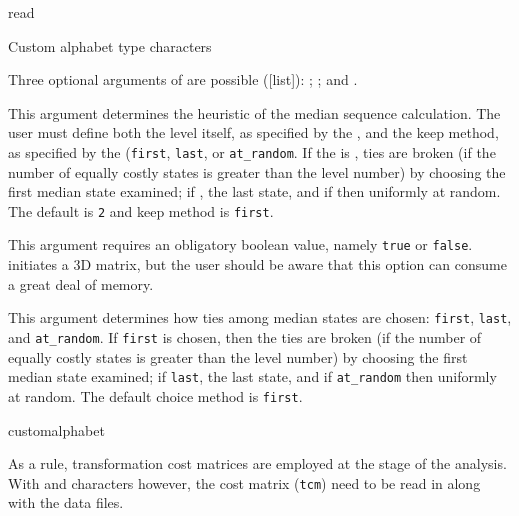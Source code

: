 \begin{command}{read}{}
\begin{arguments}
\begin{argumentgroup}{Custom alphabet type characters}
{	\smallskip
	Three optional arguments of  are possible ([\poylident list]): ; 
	; and .  

	\begin{description}
	{This argument determines the heuristic  of the median sequence calculation.  
	The user must define both the level itself, as specified by the \poyint, and the keep method, as specified 
	by the \poylident (\texttt{first}, \texttt{last}, or \texttt{at\_random}.  If the \poylident is , 
	ties are broken (if the number of equally costly states is greater than the level number) by choosing the 
	first median state examined; if , the last state, and if 
	 then uniformly at random. The default 	 is \texttt{2} and keep method is \texttt{first}.  }
	{}
	
	 {\obligatory \poybool}
	{This argument requires an obligatory boolean value, namely \texttt{true} or \texttt{false}.
	  initiates a 3D matrix, but the user should be aware 
	that this option can consume a great deal of memory.}
	{}
	
	 {\obligatory \poylident}
	{This argument determines how ties among median states are chosen: \texttt{first}, \texttt{last}, 
	and \texttt{at\_random}.  If \texttt{first} is chosen, 	then the ties are broken (if the number of 
	equally costly states is greater than the level number) by choosing the first median state examined; 
	if \texttt{last}, the last state, and if \texttt{at\_random} then uniformly at random. The default choice method is \texttt{first}.}
	{}
	
\end{description}

	}
	 {customalphabet}
	 
\end{argumentgroup}

            \begin{statement}
            As a rule, transformation cost matrices are employed at the  stage of the
            analysis.  With  and  characters however, 
            the cost matrix (\texttt{tcm}) need to  be read in along with the data files.
            \end{statement}


\end{arguments}
\end{command}
